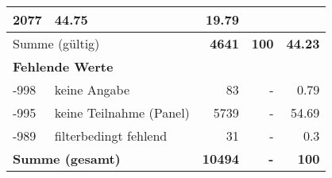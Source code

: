 \begin{longtable}{lXrrr}
       \num{2077} &
       \num[round-mode=places,round-precision=2]{44,75} &
         \num[round-mode=places,round-precision=2]{19,79} \\
     \midrule
     \multicolumn{2}{l}{Summe (gültig)} &
       \textbf{\num{4641}} &
     \textbf{100} &
       \textbf{\num[round-mode=places,round-precision=2]{44,23}} \\
     \multicolumn{5}{l}{\textbf{Fehlende Werte}}\\
       -998 &
       keine Angabe &
         \num{83} &
        - &
         \num[round-mode=places,round-precision=2]{0,79} \\
       -995 &
       keine Teilnahme (Panel) &
         \num{5739} &
        - &
         \num[round-mode=places,round-precision=2]{54,69} \\
       -989 &
       filterbedingt fehlend &
         \num{31} &
        - &
         \num[round-mode=places,round-precision=2]{0,3} \\
     \midrule
     \multicolumn{2}{l}{\textbf{Summe (gesamt)}} &
          \textbf{\num{10494}} &
        \textbf{-} &
        \textbf{100} \\
     \bottomrule
     \end{longtable}
     
